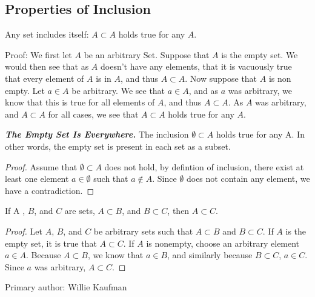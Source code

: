 \subsection{Properties of Inclusion}%
				\begin{majorEx}%
                Any set includes itself: $A \subset A$ holds true for any $A$.

Proof: We first let $A$ be an arbitrary Set. Suppose that $A$ is the empty set. We would then see that as $A$ doesn't have any elements, that it is vacuously true that every element of $A$ is in $A$, and thus  $A \subset A$. Now suppose that $A$ is non empty. Let $a \in A$ be arbitrary. We see that $a \in A$, and as $a$ was arbitrary, we know that this is true for all elements of $A$, and thus $A \subset A$. As $A$ was arbitrary, and $A \subset A$ for all cases, we see that $A \subset A$ holds true for any $A$.
				\end{majorEx}
				\begin{majorEx}%
					\textbf{\textit{The Empty Set Is Everywhere.}} The inclusion $\emptyset \subset A$ holds true for any A. In other words, the empty set is present in each set as a subset.
                    \begin{proof}
                    Assume that $\emptyset \subset A$ does not hold, by defintion of inclusion, there exist at least one element $a \in \emptyset$ such that $a \not\in A$. Since $\emptyset$ does not contain any element, we have a contradiction.
                    \end{proof}
				\end{majorEx}
				\begin{majorEx}%
					If A , $B$, and $C$ are sets, $A \subset B$, and $B \subset C$, then $A \subset C$. 
				\end{majorEx}
                \begin{proof}
                Let $A$, $B$, and $C$ be arbitrary sets such that $A \subset B$ and $B \subset C$. If $A$ is the empty set, it is true that $A \subset C$. If $A$ is nonempty, choose an arbitrary element $a \in A$. Because $A \subset B$, we know that $a \in B$, and similarly because  $B \subset C$, $a \in C$. Since $a$ was arbitrary, $A \subset C$. \newline
                \end{proof}
      		 Primary author: Willie Kaufman
